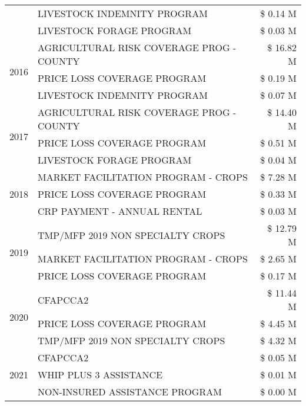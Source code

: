 \begin{tabular}{llr}
 & LIVESTOCK INDEMNITY PROGRAM & \$ 0.14 M \\
 & LIVESTOCK FORAGE PROGRAM & \$ 0.03 M \\
\cline{1-3}
\multirow[t]{3}{*}{2016} & AGRICULTURAL RISK COVERAGE PROG - COUNTY & \$ 16.82 M \\
 & PRICE LOSS COVERAGE PROGRAM & \$ 0.19 M \\
 & LIVESTOCK INDEMNITY PROGRAM & \$ 0.07 M \\
\cline{1-3}
\multirow[t]{3}{*}{2017} & AGRICULTURAL RISK COVERAGE PROG - COUNTY & \$ 14.40 M \\
 & PRICE LOSS COVERAGE PROGRAM & \$ 0.51 M \\
 & LIVESTOCK FORAGE PROGRAM & \$ 0.04 M \\
\cline{1-3}
\multirow[t]{3}{*}{2018} & MARKET FACILITATION PROGRAM - CROPS & \$ 7.28 M \\
 & PRICE LOSS COVERAGE PROGRAM & \$ 0.33 M \\
 & CRP PAYMENT - ANNUAL RENTAL & \$ 0.03 M \\
\cline{1-3}
\multirow[t]{3}{*}{2019} & TMP/MFP 2019 NON SPECIALTY CROPS & \$ 12.79 M \\
 & MARKET FACILITATION PROGRAM - CROPS & \$ 2.65 M \\
 & PRICE LOSS COVERAGE PROGRAM & \$ 0.17 M \\
\cline{1-3}
\multirow[t]{3}{*}{2020} & CFAPCCA2 & \$ 11.44 M \\
 & PRICE LOSS COVERAGE PROGRAM & \$ 4.45 M \\
 & TMP/MFP 2019 NON SPECIALTY CROPS & \$ 4.32 M \\
\cline{1-3}
\multirow[t]{3}{*}{2021} & CFAPCCA2 & \$ 0.05 M \\
 & WHIP PLUS 3 ASSISTANCE & \$ 0.01 M \\
 & NON-INSURED ASSISTANCE PROGRAM & \$ 0.00 M \\
\cline{1-3}
\bottomrule
\end{tabular}
